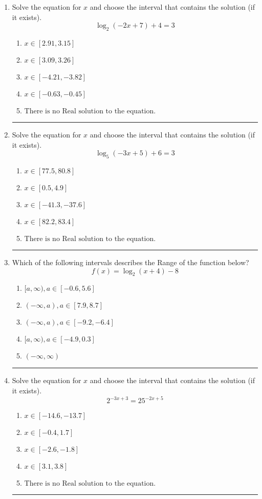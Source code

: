 \documentclass[14pt]{extbook}
\newcommand{\litem}[1]{\item#1\hspace*{-1cm}\rule{\textwidth}{0.4pt}}
\begin{document}
\begin{enumerate}
{\begin{enumerate}[label=\Alph*.]
\end{enumerate} }
\litem{
Solve the equation for $x$ and choose the interval that contains the solution (if it exists).\[ \log_{2}{(-2x+7)}+4 = 3 \]\begin{enumerate}[label=\Alph*.]
\item \( x \in [2.91, 3.15] \)
\item \( x \in [3.09, 3.26] \)
\item \( x \in [-4.21, -3.82] \)
\item \( x \in [-0.63, -0.45] \)
\item \( \text{There is no Real solution to the equation.} \)

\end{enumerate} }
\litem{
Solve the equation for $x$ and choose the interval that contains the solution (if it exists).\[ \log_{5}{(-3x+5)}+6 = 3 \]\begin{enumerate}[label=\Alph*.]
\item \( x \in [77.5, 80.8] \)
\item \( x \in [0.5, 4.9] \)
\item \( x \in [-41.3, -37.6] \)
\item \( x \in [82.2, 83.4] \)
\item \( \text{There is no Real solution to the equation.} \)

\end{enumerate} }
\litem{
Which of the following intervals describes the Range of the function below?\[ f(x) = \log_2{(x+4)}-8 \]\begin{enumerate}[label=\Alph*.]
\item \( [a, \infty), a \in [-0.6, 5.6] \)
\item \( (-\infty, a), a \in [7.9, 8.7] \)
\item \( (-\infty, a), a \in [-9.2, -6.4] \)
\item \( [a, \infty), a \in [-4.9, 0.3] \)
\item \( (-\infty, \infty) \)

\end{enumerate} }
\litem{
Solve the equation for $x$ and choose the interval that contains the solution (if it exists).\[ 2^{-3x+3} = 25^{-2x+5} \]\begin{enumerate}[label=\Alph*.]
\item \( x \in [-14.6, -13.7] \)
\item \( x \in [-0.4, 1.7] \)
\item \( x \in [-2.6, -1.8] \)
\item \( x \in [3.1, 3.8] \)
\item \( \text{There is no Real solution to the equation.} \)


\end{enumerate}}
\end{enumerate}
\end{document}
